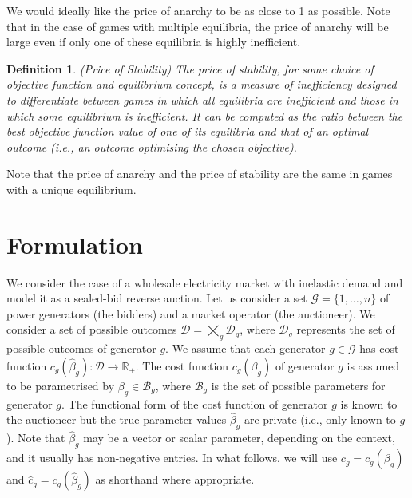 \documentclass{article}
\newtheorem{definition}{Definition}
\begin{document}
We would ideally like the price of anarchy to be as close to 1 as possible. Note that in the case of games with multiple equilibria, the price of anarchy will be large even if only one of these equilibria is highly inefficient. 

\begin{definition}
(Price of Stability) The price of stability, for some choice of objective function and equilibrium concept, is a measure of inefficiency designed to differentiate between games in which all equilibria are inefficient and those in which some equilibrium is inefficient. It can be computed as the ratio between the best objective function value of one of its equilibria and that of an optimal outcome (i.e., an outcome optimising the chosen objective).
\end{definition}

Note that the price of anarchy and the price of stability are the same in games with a unique equilibrium.

\section{Formulation}

We consider the case of a wholesale electricity market with inelastic demand and model it as a sealed-bid reverse auction. Let us consider a set $\mathcal{G} = \{1, \ldots, n\}$ of power generators (the bidders) and a market operator (the auctioneer). We consider a set of possible outcomes $\mathcal{D} = \bigtimes_g \mathcal{D}_g$, where $\mathcal{D}_g$ represents the set of possible outcomes of generator $g$. We assume that each generator $g \in \mathcal{G}$ has cost function $c_g(\hat{\beta}_g): \mathcal{D} \rightarrow \mathbb{R}_+$. The cost function $c_g(\beta_g)$ of generator $g$ is assumed to be parametrised by $\beta_g \in \mathcal{B}_g$, where $\mathcal{B}_g$ is the set of possible parameters for generator $g$. The functional form of the cost function of generator $g$ is known to the auctioneer but the true parameter values $\hat{\beta}_g$ are private (i.e., only known to $g$). Note that $\hat{\beta}_g$ may be a vector or scalar parameter, depending on the context, and it usually has non-negative entries. In what follows, we will use $c_g = c_g(\beta_g)$ and $\hat{c}_g = c_g(\hat{\beta}_g)$ as shorthand where appropriate.
\end{document}
